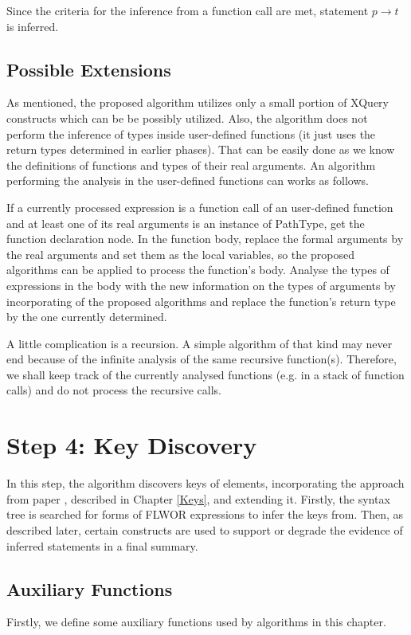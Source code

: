 Since the criteria for the inference from a function call are met, statement $p \rightarrow t$ is inferred.

\subsection{Possible Extensions}
As mentioned, the proposed algorithm utilizes only a small portion of XQuery constructs which can be be possibly utilized. Also, the algorithm does not perform the inference of types inside user-defined functions (it just uses the return types determined in earlier phases). That can be easily done as we know the definitions of functions and types of their real arguments. An algorithm performing the analysis in the user-defined functions can works as follows.

If a currently processed expression is a function call of an user-defined function and at least one of its real arguments is an instance of PathType, get the function declaration node. In the function body, replace the formal arguments by the real arguments and set them as the local variables, so the proposed algorithms can be applied to process the function's body. Analyse the types of expressions in the body with the new information on the types of arguments by incorporating of the proposed algorithms and replace the function's return type by the one currently determined.

A little complication is a recursion. A simple algorithm of that kind may never end because of the infinite analysis of the same recursive function(s). Therefore, we shall keep track of the currently analysed functions (e.g. in a stack of function calls) and do not process the recursive calls. 

\section{Step 4: Key Discovery}
In this step, the algorithm discovers keys of elements, incorporating the approach from paper \cite{Necasky:2009:DXK:1529282.1529414}, described in Chapter \ref{Keys}, and extending it. Firstly, the syntax tree is searched for forms of FLWOR expressions to infer the keys from. Then, as described later, certain constructs are used to support or degrade the evidence of inferred statements in a final summary.

\subsection{Auxiliary Functions} \label{step_4_auxiliary_functions}
Firstly, we define some auxiliary functions used by algorithms in this chapter.

